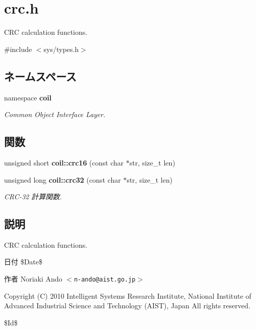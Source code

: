 \section{crc.h}
\label{crc_8h}


CRC calculation functions.  


{\ttfamily \#include $<$sys/types.h$>$}\par
\subsection*{ネームスペース}
\begin{DoxyCompactItemize}
\item 
namespace {\bf coil}


\begin{DoxyCompactList}\small\item\em Common Object Interface Layer. \item\end{DoxyCompactList}

\end{DoxyCompactItemize}
\subsection*{関数}
\begin{DoxyCompactItemize}
\item 
unsigned short {\bf coil::crc16} (const char $\ast$str, size\_\-t len)
\item 
unsigned long {\bf coil::crc32} (const char $\ast$str, size\_\-t len)
\begin{DoxyCompactList}\small\item\em CRC-\/32 計算関数. \item\end{DoxyCompactList}\end{DoxyCompactItemize}


\subsection{説明}
CRC calculation functions. \begin{DoxyDate}{日付}
\$Date\$ 
\end{DoxyDate}
\begin{DoxyAuthor}{作者}
Noriaki Ando $<${\tt n-\/ando@aist.go.jp}$>$
\end{DoxyAuthor}
Copyright (C) 2010 Intelligent Systems Research Institute, National Institute of Advanced Industrial Science and Technology (AIST), Japan All rights reserved.

\$Id\$ 